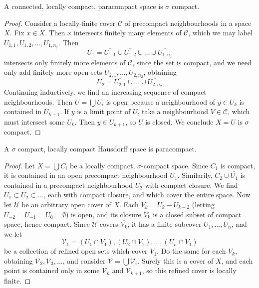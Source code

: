 \begin{lemma}[$4) \to (1$]
    A connected, locally compact, paracompact space is $\sigma$ compact.
\end{lemma}
\begin{proof}
    Consider a locally-finite cover $\mathcal{C}$ of precompact neighbourhoods in a space $X$. Fix $x \in X$. Then $x$ intersects finitely many elements of $\mathcal{C}$, which we may label $U_{1,1}, U_{1,2}, \dots, U_{1,n_1}$. Then
    \[ U_1 = \overline{U_{1,1}} \cup \overline{U_{1,2}} \cup \dots \cup \overline{U_{{1,n_1}}} \]
    intersects only finitely more elements of $\mathcal{C}$, since the set is compact, and we need only add finitely more open sets $U_{2,1}, \dots, U_{2,n_2}$, obtaining
    \[ U_2 = \overline{U_{2,1}} \cup \dots \cup \overline{U_{2,n_2}} \]
    Continuing inductively, we find an increasing sequence of compact neighbourhoods. Then $U = \bigcup U_i$ is open because a neighbourhood of $y \in U_k$ is contained in $U_{k+1}$. If $y$ is a limit point of $U$, take a neighbourhood $V \in \mathcal{C}$, which must intersect some $U_k$. Then $y \in U_{k+1}$, so $U$ is closed. We conclude $X = U$ is $\sigma$ compact.
\end{proof}

\begin{lemma}[$1) \to (4$]
    A $\sigma$ compact, locally compact Hausdorff space is paracompact.
\end{lemma}
\begin{proof}
    Let $X = \bigcup C_i$ be a locally compact, $\sigma$-compact space. Since $C_1$ is compact, it is contained in an open precompact neighbourhood $U_1$. Similarily, $C_2 \cup \overline{U_1}$ is contained in a precompact neighbourhood $U_2$ with compact closure. We find $U_1 \subset U_2 \subset \dots$, each with compact closure, and which cover the entire space. Now let $\mathcal{U}$ be an arbitrary open cover of $X$. Each $V_k = U_{k} - \overline{U_{k-2}}$ (letting $U_{-2} = U_{-1} = U_0 = \emptyset$) is open, and its closure $\overline{V_k}$ is a closed subset of compact space, hence compact. Since $\mathcal{U}$ covers $\overline{V_k}$, it has a finite subcover $U_1, \dots, U_n$, and we let
    \[ \mathcal{V}_1 = (U_1 \cap V_1), (U_2 \cap V_1), \dots, (U_n \cap V_1) \]
    be a collection of refined open sets which cover $V_1$. Do the same for each $V_k$, obtaining $\mathcal{V}_2, \mathcal{V}_3, \dots$, and consider $\mathcal{V} = \bigcup \mathcal{V}_i$. Surely this is a cover of $X$, and each point is contained only in some $\mathcal{V}_k$ and $\mathcal{V}_{k+1}$, so this refined cover is locally finite.
\end{proof}

